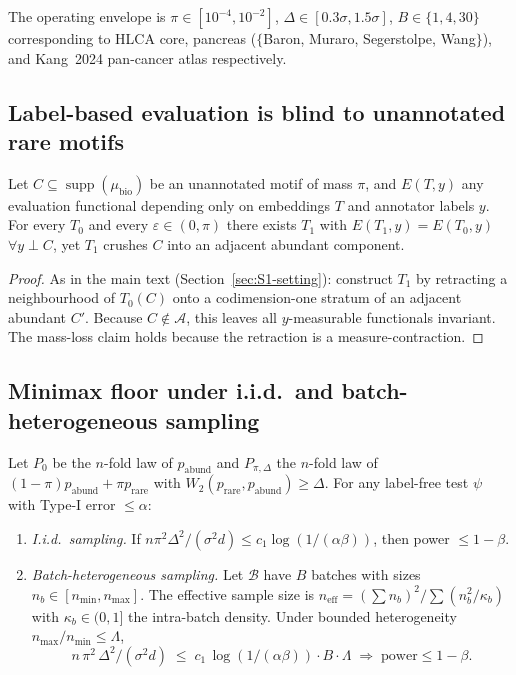 The operating envelope is $\pi\in[10^{-4},10^{-2}]$, $\Delta\in[0.3\sigma,1.5\sigma]$, $B\in\{1,4,30\}$ corresponding to HLCA core, pancreas ($\{$Baron, Muraro, Segerstolpe, Wang$\}$), and Kang~2024 pan-cancer atlas respectively.

\subsection{Label-based evaluation is blind to unannotated rare motifs}
\label{sec:S1-blindspot}

\begin{theorem}
\label{thm:S1-blindspot}\label{thm:labelblind}
Let $C\subseteq \operatorname{supp}(\mu_{\text{bio}})$ be an unannotated motif of mass $\pi$, and $E(T,y)$ any evaluation functional depending only on embeddings $T$ and annotator labels $y$. For every $T_{0}$ and every $\varepsilon\in(0,\pi)$ there exists $T_{1}$ with $E(T_{1},y)=E(T_{0},y)$ $\forall y\perp C$, yet $T_{1}$ crushes $C$ into an adjacent abundant component.
\end{theorem}

\begin{proof}
As in the main text (Section~\ref{sec:S1-setting}): construct $T_{1}$ by retracting a neighbourhood of $T_{0}(C)$ onto a codimension-one stratum of an adjacent abundant $C'$. Because $C\notin \mathcal{A}$, this leaves all $y$-measurable functionals invariant. The mass-loss claim holds because the retraction is a measure-contraction.
\end{proof}

\subsection{Minimax floor under i.i.d.\ and batch-heterogeneous sampling}
\label{sec:S1-minimax}\label{sec:minimax-detectability}

\begin{theorem}
\label{thm:S1-minimax}\label{thm:minimax}
Let $P_{0}$ be the $n$-fold law of $p_{\text{abund}}$ and $P_{\pi,\Delta}$ the $n$-fold law of $(1-\pi)p_{\text{abund}}+\pi p_{\text{rare}}$ with $W_{2}(p_{\text{rare}}, p_{\text{abund}})\geq \Delta$. For any label-free test $\psi$ with Type-I error $\leq \alpha$:
\begin{enumerate}[leftmargin=*]
  \item \emph{I.i.d.\ sampling.} If $n\pi^{2}\Delta^{2}/(\sigma^{2}d)\leq c_{1}\log(1/(\alpha\beta))$, then power $\leq 1-\beta$.
  \item \emph{Batch-heterogeneous sampling.} Let $\mathcal{B}$ have $B$ batches with sizes $n_{b}\in[n_{\min}, n_{\max}]$. The effective sample size is $n_{\mathrm{eff}} = (\sum n_{b})^{2}/\sum (n_{b}^{2}/\kappa_{b})$ with $\kappa_{b}\in(0,1]$ the intra-batch density. Under bounded heterogeneity $n_{\max}/n_{\min}\leq \Lambda$,
  \[
    n\,\pi^{2}\,\Delta^{2}/(\sigma^{2} d)\;\leq\; c_{1}\,\log(1/(\alpha\beta))\cdot B\cdot \Lambda
    \;\Longrightarrow\;\text{power}\leq 1-\beta.
  \]
\end{enumerate}
\end{theorem}

